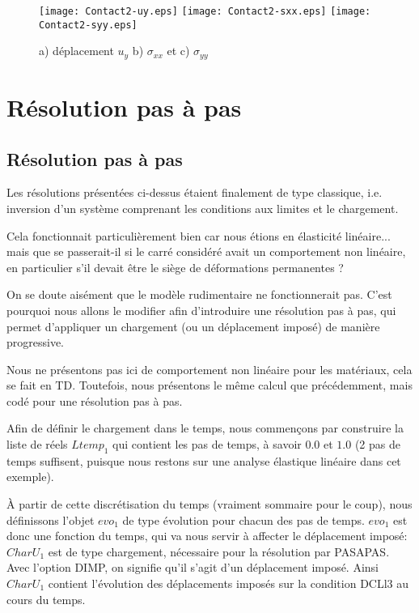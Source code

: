 \begin{figure}[ht]
   \texttt{[image: Contact2-uy.eps]} \hfill 
   \texttt{[image: Contact2-sxx.eps]}\hfill 
   \texttt{[image: Contact2-syy.eps]}
   \caption{\label{Fig-Cont22} a) déplacement $u_y$ b) $\sigma_{xx}$ et c) $\sigma_{yy}$}
\end{figure}














\medskip
\ifVersionAvecExemplesSepares
   \section{Résolution pas à pas}
\else
   \subsection{Résolution pas à pas}
\fi

Les résolutions présentées ci-dessus étaient finalement de type classique, i.e. inversion
d'un système comprenant les conditions aux limites et le chargement.

Cela fonctionnait particulièrement bien car nous étions en élasticité linéaire...
mais que se passerait-il si le carré considéré avait un comportement non linéaire,
en particulier s'il devait être le siège de déformations permanentes ?

On se doute aisément que le modèle rudimentaire ne fonctionnerait pas.
C'est pourquoi nous allons le modifier afin d'introduire une résolution pas à pas, qui permet 
d'appliquer un chargement (ou un déplacement imposé) de manière progressive.

\medskip
Nous ne présentons pas ici de comportement non linéaire pour les matériaux, cela se fait
en TD. Toutefois, nous présentons le même calcul que précédemment, mais codé
pour une résolution pas à pas.

\medskip
Afin de définir le chargement dans le temps, nous commençons par construire la liste de réels $Ltemp_1$ 
qui contient les pas de temps, à savoir $0.0$ et $1.0$ (2 pas de temps suffisent, puisque nous
restons sur une analyse élastique linéaire dans cet exemple).

À partir de cette discrétisation du temps (vraiment sommaire pour le coup), nous définissons l'objet $evo_1$
de type évolution pour chacun des pas de temps. $evo_1$ est donc une fonction du temps, qui va nous servir
à affecter le déplacement imposé: $CharU_1$ est de type chargement, nécessaire pour la résolution par
PASAPAS. Avec l'option DIMP, on signifie qu'il s'agit d'un déplacement imposé. Ainsi $CharU_1$ contient 
l'évolution des déplacements imposés sur la condition DCLl3 au cours du temps.

